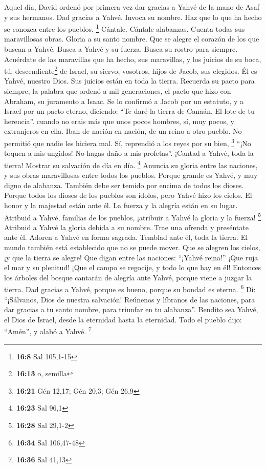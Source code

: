 \begin{paracol}{2}
 Aquel día, David ordenó por primera vez dar gracias a
Yahvé de la mano de Asaf y sus hermanos.  Dad gracias a
Yahvé. Invoca su nombre. Haz que lo que ha hecho se conozca entre los
pueblos. \footnote{\textbf{16:8} Sal 105,1-15}  Cántale.
Cántale alabanzas. Cuenta todas sus maravillosas obras. 
Gloria a su santo nombre. Que se alegre el corazón de los que buscan a
Yahvé.  Busca a Yahvé y su fuerza. Busca su rostro para
siempre.  Acuérdate de las maravillas que ha hecho, sus
maravillas, y los juicios de su boca,  tú,
descendiente\footnote{\textbf{16:13} o, semilla} de Israel, su siervo,
vosotros, hijos de Jacob, sus elegidos.  Él es Yahvé,
nuestro Dios. Sus juicios están en toda la tierra. 
Recuerda su pacto para siempre, la palabra que ordenó a mil
generaciones,  el pacto que hizo con Abraham, su
juramento a Isaac.  Se lo confirmó a Jacob por un
estatuto, y a Israel por un pacto eterno,  diciendo: ``Te
daré la tierra de Canaán, El lote de tu herencia''. 
cuando no erais más que unos pocos hombres, sí, muy pocos, y extranjeros
en ella.  Iban de nación en nación, de un reino a otro
pueblo.  No permitió que nadie les hiciera mal. Sí,
reprendió a los reyes por su bien, \footnote{\textbf{16:21} Gén 12,17;
  Gén 20,3; Gén 26,9}  ``¡No toquen a mis ungidos! No
hagas daño a mis profetas''.  ¡Cantad a Yahvé, toda la
tierra! Mostrar su salvación de día en día. \footnote{\textbf{16:23} Sal
  96,1}  Anuncia su gloria entre las naciones, y sus
obras maravillosas entre todos los pueblos.  Porque
grande es Yahvé, y muy digno de alabanza. También debe ser temido por
encima de todos los dioses.  Porque todos los dioses de
los pueblos son ídolos, pero Yahvé hizo los cielos.  El
honor y la majestad están ante él. La fuerza y la alegría están en su
lugar.  Atribuid a Yahvé, familias de los pueblos,
¡atribuir a Yahvé la gloria y la fuerza! \footnote{\textbf{16:28} Sal
  29,1-2}  Atribuid a Yahvé la gloria debida a su nombre.
Trae una ofrenda y preséntate ante él. Adoren a Yahvé en forma sagrada.
 Temblad ante él, toda la tierra. El mundo también está
establecido que no se puede mover.  Que se alegren los
cielos, ¡y que la tierra se alegre! Que digan entre las naciones:
``¡Yahvé reina!''  ¡Que ruja el mar y su plenitud! ¡Que
el campo se regocije, y todo lo que hay en él!  Entonces
los árboles del bosque cantarán de alegría ante Yahvé, porque viene a
juzgar la tierra.  Dad gracias a Yahvé, porque es bueno,
porque su bondad es eterna. \footnote{\textbf{16:34} Sal 106,47-48}
 Di: ``¡Sálvanos, Dios de nuestra salvación! Reúnenos y
líbranos de las naciones, para dar gracias a tu santo nombre, para
triunfar en tu alabanza''.  Bendito sea Yahvé, el Dios de
Israel, desde la eternidad hasta la eternidad. Todo el pueblo dijo:
``Amén'', y alabó a Yahvé. \footnote{\textbf{16:36} Sal 41,13}


\end{paracol}
